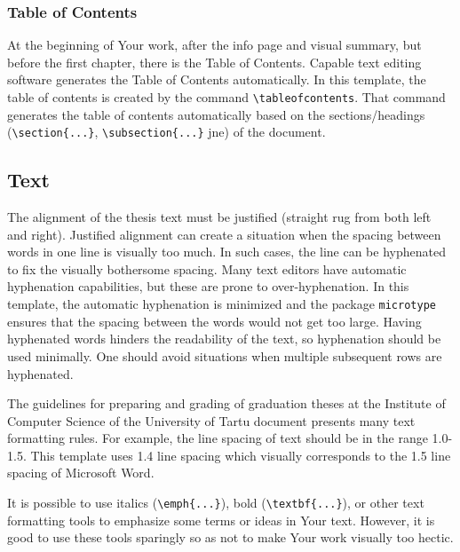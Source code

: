 \subsubsection{Table of Contents}
At the beginning of Your work, after the info page and visual summary, but before the first chapter, there is the Table of Contents. Capable text editing software generates the Table of Contents automatically. In this template, the table of contents is created by the command \verb|\tableofcontents|. That command generates the table of contents automatically based on the sections/headings (\verb|\section{...}|, \verb|\subsection{...}| jne) of the document.

\subsection{Text}
The alignment of the thesis text must be justified (straight rug from both left and right). Justified alignment can create a situation when the spacing between words in one line is visually too much. In such cases, the line can be hyphenated to fix the visually bothersome spacing. Many text editors have automatic hyphenation capabilities, but these are prone to over-hyphenation. In this template, the automatic hyphenation is minimized and the package \verb|microtype| ensures that the spacing between the words would not get too large. Having hyphenated words hinders the readability of the text, so hyphenation should be used minimally. One should avoid situations when multiple subsequent rows are hyphenated.

The guidelines for preparing and grading of graduation theses at the Institute of Computer Science of the University of Tartu document presents many text formatting rules. For example, the line spacing of text should be in the range 1.0-1.5. This template uses 1.4 line spacing which visually corresponds to the 1.5 line spacing of Microsoft Word.

It is possible to use italics (\verb|\emph{...}|), bold (\verb|\textbf{...}|), or other text formatting tools to emphasize some terms or ideas in Your text. However, it is good to use these tools sparingly so as not to make Your work visually too hectic.

